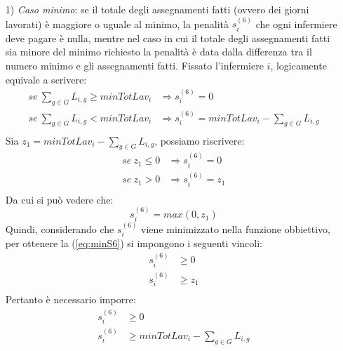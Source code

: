 \begin{itemize}

\item [1)] \textit{Caso minimo}: se il totale degli assegnamenti fatti (ovvero dei giorni lavorati) è maggiore o uguale al minimo, la penalità $s^{(6)}_{i}$ che ogni infermiere deve pagare è nulla, mentre nel caso in cui il totale degli assegnamenti fatti sia minore del minimo richiesto la penalità è data dalla differenza tra il numero minimo e gli assegnamenti fatti. Fissato l'infermiere $i$, logicamente equivale a scrivere:
\begin{equation}
\begin{split}
se ~ \sum_{g \in G} L_{i, g} \geq minTotLav_i &\Longrightarrow s^{(6)}_{i} = 0 \\
se ~ \sum_{g \in G} L_{i, g} < minTotLav_i &\Longrightarrow s^{(6)}_{i} = minTotLav_i - \sum_{g \in G} L_{i, g} \\
\end{split}
\end{equation}
Sia $z_1 = minTotLav_i - \sum_{g \in G} L_{i, g}$, possiamo riscrivere:
\begin{equation}
\begin{split}
se ~ z_1 \leq 0 &\Longrightarrow s^{(6)}_{i} = 0 \\
se ~ z_1 > 0 &\Longrightarrow s^{(6)}_{i} = z_1 \\
\end{split}
\end{equation}
Da cui si può vedere che:
\begin{equation}
\label{eq:minS6}
s^{(6)}_{i} = max(0, z_1)
\end{equation}
Quindi, considerando che $s^{(6)}_{i}$ viene minimizzato nella funzione obbiettivo, per ottenere la (\ref{eq:minS6}) si impongono i seguenti vincoli:
\begin{equation}
\begin{split}
s^{(6)}_{i} &\geq 0 \\
s^{(6)}_{i} &\geq z_1 \\
\end{split}
\end{equation}
Pertanto è necessario imporre:
\begin{equation}
\begin{split}
s^{(6)}_{i} &\geq 0 \\
s^{(6)}_{i} &\geq minTotLav_i - \sum_{g \in G} L_{i, g} \\
\end{split}
\end{equation}


\end{itemize}
